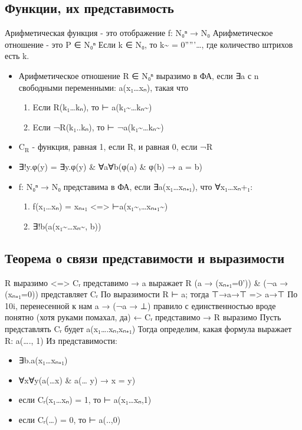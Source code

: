 \documentclass[11pt]{article}
\begin{document}
\subsection{Функции, их представимость}
\label{sec-11-1}
Арифметическая функция - это отображение f: N₀ⁿ → N₀
Арифметическое отношение - это P ∈ N₀ⁿ
Если k ∈ N₀, то k\textasciitilde{} = 0'''''\ldots{}, где количество штрихов
есть k.
\begin{itemize}
\item Арифметическое отношение R ∈ N₀ⁿ выразимо в ФА, если
∃a с n свободными переменными:
a(x₁\ldots{}xₙ), такая что
\begin{enumerate}
\item Eсли R(k₁\ldots{}kₙ), то ⊢ a(k₁\textasciitilde{}\ldots{}kₙ\textasciitilde{})
\item Eсли ¬R(k₁..kₙ), то ⊢ ¬a(k₁\textasciitilde{}\ldots{}kₙ\textasciitilde{})
\end{enumerate}
\item C$_{\text{R}}$ - функция, равная 1, если R, и равная 0, если ¬R
\item ∃!y.φ(y) = ∃y.φ(y) \& ∀a∀b(φ(a) \& φ(b) → a = b)
\item f: N₀ⁿ → N₀ представима в ФА, если ∃a(x₁\ldots{}xₙ₊₁), что
∀x₁\ldots{}xₙ+₁:
\begin{enumerate}
\item f(x₁\ldots{}xₙ) = xₙ₊₁ <=> ⊢a(x₁\textasciitilde{},\ldots{}xₙ₊₁\textasciitilde{})
\item ∃!b(a(x₁\textasciitilde{}\ldots{}xₙ\textasciitilde{}, b))
\end{enumerate}
\end{itemize}
\subsection{Теорема о связи представимости и выразимости}
\label{sec-11-2}
R выразимо <=> Cᵣ представимо
→ a выражает R
(a → (xₙ₊₁=0')) \& (¬a → (xₙ₊₁=0))
представляет Cᵣ
По выразимости R ⊢ a; тогда ⊤→a→⊤ => a→⊤
По 10i, перенесенной к нам a → (¬a → ⊥)
правило с единственностью вроде понятно (хотя руками помахал, да)
← Cᵣ представимо → R выразимо
Пусть представлять Cᵣ будет
a(x₁\ldots{}.xₙ,xₙ₊₁)
Тогда определим, какая формула выражает R:
a(\ldots{}., 1)
Из представимости:
\begin{itemize}
\item ∃b.a(x₁\ldots{}xₙ₊₁)
\item ∀x∀y(a(\ldots{}x) \& a(\ldots{} y) → x = y)
\item если Cᵣ(x₁\ldots{}xₙ) = 1, то ⊢ a(x₁\ldots{}xₙ,1)
\item если Cᵣ(\ldots{}) = 0, то ⊢ a(..,0)
\end{itemize}
\end{document}
